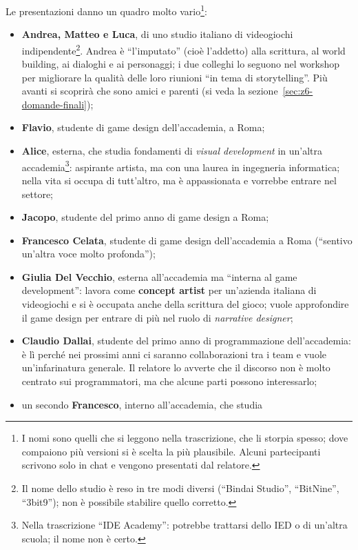 Le presentazioni danno un quadro molto vario\footnote{I nomi sono quelli che si
leggono nella trascrizione, che li storpia spesso; dove compaiono più versioni
si è scelta la più plausibile. Alcuni partecipanti scrivono solo in chat e
vengono presentati dal relatore.}:
\begin{itemize}
  \item \textbf{Andrea, Matteo e Luca}, di uno studio italiano di videogiochi
        indipendente\footnote{Il nome dello studio è reso in tre modi diversi
        (``Bindai Studio'', ``BitNine'', ``3bit9''); non è possibile stabilire
        quello corretto.}. Andrea è ``l'imputato'' (cioè l'addetto) alla
        scrittura, al world building, ai dialoghi e ai personaggi; i due
        colleghi lo seguono nel workshop per migliorare la qualità delle loro
        riunioni ``in tema di storytelling''. Più avanti si scoprirà che sono
        amici e parenti (si veda la sezione~\ref{sec:z6-domande-finali});
  \item \textbf{Flavio}, studente di game design dell'accademia, a Roma;
  \item \textbf{Alice}, esterna, che studia fondamenti di \emph{visual
        development} in un'altra accademia\footnote{Nella trascrizione ``IDE
        Academy'': potrebbe trattarsi dello IED o di un'altra scuola; il nome
        non è certo.}: aspirante artista, ma con una laurea in ingegneria
        informatica; nella vita si occupa di tutt'altro, ma è appassionata e
        vorrebbe entrare nel settore;
  \item \textbf{Jacopo}, studente del primo anno di game design a Roma;
  \item \textbf{Francesco Celata}, studente di game design dell'accademia a
        Roma (``sentivo un'altra voce molto profonda'');
  \item \textbf{Giulia Del Vecchio}, esterna all'accademia ma ``interna al game
        development'': lavora come \textbf{concept artist} per un'azienda
        italiana di videogiochi e si è occupata anche della scrittura del gioco;
        vuole approfondire il game design per entrare di più nel ruolo di
        \emph{narrative designer};
  \item \textbf{Claudio Dallai}, studente del primo anno di programmazione
        dell'accademia: è lì perché nei prossimi anni ci saranno collaborazioni
        tra i team e vuole un'infarinatura generale. Il relatore lo avverte che
        il discorso non è molto centrato sui programmatori, ma che alcune parti
        possono interessarlo;
  \item un secondo \textbf{Francesco}, interno all'accademia, che studia

\end{itemize}
